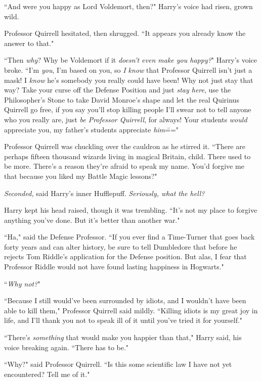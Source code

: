 ``And were you happy as Lord Voldemort, then?" Harry's voice had risen, grown wild.

Professor Quirrell hesitated, then shrugged. ``It appears you already know the answer to that."

``Then \emph{why}? Why be Voldemort if it \emph{doesn't even make you happy?}" Harry's voice broke. ``I'm \emph{you}, I'm based on you, so \emph{I know} that Professor Quirrell isn't just a mask! I \emph{know} he's somebody you really could have been! Why not just stay that way? Take your curse off the Defense Position and just \emph{stay here}, use the Philosopher's Stone to take David Monroe's shape and let the real Quirinus Quirrell go free, if you say you'll stop killing people I'll swear not to tell anyone who you really are, just \emph{be Professor Quirrell}, for always! Your students \emph{would} appreciate you, my father's students appreciate \emph{him}\==="

Professor Quirrell was chuckling over the cauldron as he stirred it. ``There are perhaps fifteen thousand wizards living in magical Britain, child. There used to be more. There's a reason they're afraid to speak my name. You'd forgive me that because you liked my Battle Magic lessons?"

\emph{Seconded,} said Harry's inner Hufflepuff. \emph{Seriously, what the hell?}

Harry kept his head raised, though it was trembling. ``It's not my place to forgive anything you've done. But it's better than another war."

``Ha," said the Defense Professor. ``If you ever find a Time-Turner that goes back forty years and can alter history, be sure to tell Dumbledore that before he rejects Tom Riddle's application for the Defense position. But alas, I fear that Professor Riddle would not have found lasting happiness in Hogwarts."

``\emph{Why not?}"

``Because I still would've been surrounded by idiots, and I wouldn't have been able to kill them," Professor Quirrell said mildly. ``Killing idiots is my great joy in life, and I'll thank you not to speak ill of it until you've tried it for yourself."

``There's \emph{something} that would make you happier than that," Harry said, his voice breaking again. ``There has to be."

``Why?" said Professor Quirrell. ``Is this some scientific law I have not yet encountered? Tell me of it."

